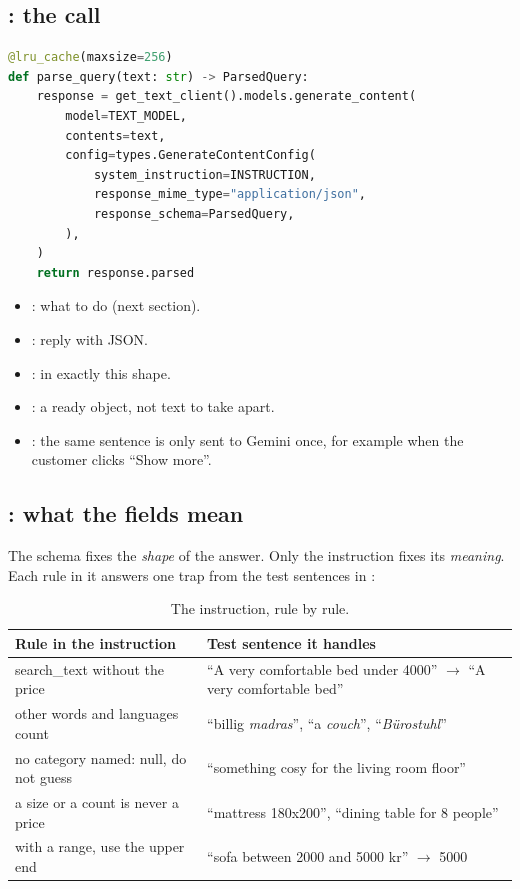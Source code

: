 \documentclass[11pt]{article}
\begin{document}
\subsection{: the call}

\begin{lstlisting}[language=Python]
@lru_cache(maxsize=256)
def parse_query(text: str) -> ParsedQuery:
    response = get_text_client().models.generate_content(
        model=TEXT_MODEL,
        contents=text,
        config=types.GenerateContentConfig(
            system_instruction=INSTRUCTION,
            response_mime_type="application/json",
            response_schema=ParsedQuery,
        ),
    )
    return response.parsed
\end{lstlisting}
\begin{itemize}[leftmargin=1.4em, itemsep=2pt]
\item {}: what to do (next section).
\item {}: reply with JSON.
\item {}: in exactly this shape.
\item {}: a ready  object, not
  text to take apart.
\item {}: the same sentence is only sent
  to Gemini once, for example when the customer clicks ``Show more''.
\end{itemize}

\subsection{: what the fields mean}

The schema fixes the \emph{shape} of the answer. Only the instruction
fixes its \emph{meaning}. Each rule in it answers one trap from the test
sentences in :

\begin{table}[H]
\small
\begin{tabularx}{\textwidth}{@{}l X@{}}
\toprule
Rule in the instruction & Test sentence it handles \\
\midrule
search\_text without the price & ``A very comfortable bed under 4000''
  $\rightarrow$ ``A very comfortable bed'' \\
other words and languages count & ``billig \emph{madras}'', ``a
  \emph{couch}'', ``\emph{Bürostuhl}'' \\
no category named: null, do not guess &
  \textcolor{accent}{``something cosy for the living room floor''} \\
a size or a count is never a price & ``mattress 180x200'', ``dining
  table for 8 people'' \\
with a range, use the upper end & ``sofa between 2000 and 5000 kr''
  $\rightarrow$ 5000 \\
\bottomrule
\end{tabularx}
\caption{The instruction, rule by rule.}
\end{table}
\end{document}
